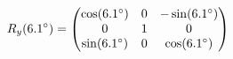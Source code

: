 \documentclass[preview]{standalone}
\begin{document}
\begin{align*}
\special{dvisvgm:raw <g id='unique000'>}R_y(6.1^\circ) = \begin{pmatrix} \cos(6.1^\circ) & 0 & -\sin(6.1^\circ) \\ 0 & 1 & 0 \\ \sin(6.1^\circ) & 0 & \cos(6.1^\circ) \end{pmatrix}\special{dvisvgm:raw </g>}
\end{align*}
\end{document}
